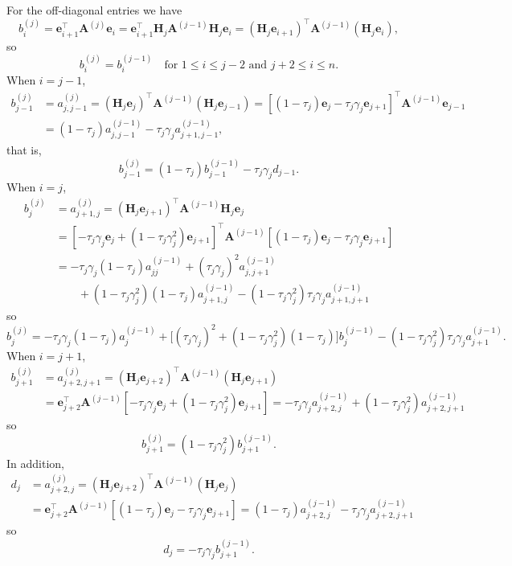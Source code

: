 \documentclass[12pt,a4paper]{article}
\newcommand{\bs}[1]{\boldsymbol{#1}}
\begin{document}
For the off-diagonal entries we have
\[
b^{(j)}_i=\bs{e}_{i+1}^\top\bs{A}^{(j)}\bs{e}_i
	=\bs{e}_{i+1}^\top\bs{H}_j\bs{A}^{(j-1)}\bs{H}_j\bs{e}_i
	=(\bs{H}_j\bs{e}_{i+1})^\top\bs{A}^{(j-1)}(\bs{H}_j\bs{e}_i),
\]
so
\[
b^{(j)}_i=b^{(j-1)}_i\quad\text{for $1\le i\le j-2$ and $j+2\le i\le n$.}
\]
When $i=j-1$,
\begin{align*}
b^{(j)}_{j-1}&=a^{(j)}_{j,j-1}
	=(\bs{H}_j\bs{e}_j)^\top\bs{A}^{(j-1)}(\bs{H}_j\bs{e}_{j-1})
	=[(1-\tau_j)\bs{e}_j-\tau_j\gamma_j\bs{e}_{j+1}]^\top
		\bs{A}^{(j-1)}\bs{e}_{j-1}\\
	&=(1-\tau_j)a^{(j-1)}_{j,j-1}-\tau_j\gamma_ja^{(j-1)}_{j+1,j-1},
\end{align*}
that is,
\[
b^{(j)}_{j-1}=(1-\tau_j)b^{(j-1)}_{j-1}-\tau_j\gamma_jd_{j-1}.
\]
When $i=j$,
\begin{align*}
b^{(j)}_j&=a^{(j)}_{j+1,j}
	=(\bs{H}_j\bs{e}_{j+1})^\top\bs{A}^{(j-1)}\bs{H}_j\bs{e}_j\\
	&=[-\tau_j\gamma_j\bs{e}_j+(1-\tau_j\gamma_j^2)\bs{e}_{j+1}]^\top
	\bs{A}^{(j-1)}[(1-\tau_j)\bs{e}_j-\tau_j\gamma_j\bs{e}_{j+1}]\\
	&=-\tau_j\gamma_j(1-\tau_j)a^{(j-1)}_{jj}
	+(\tau_j\gamma_j)^2a^{(j-1)}_{j,j+1}\\
	&\qquad{}+(1-\tau_j\gamma_j^2)(1-\tau_j)a^{(j-1)}_{j+1,j}
	-(1-\tau_j\gamma_j^2)\tau_j\gamma_ja^{(j-1)}_{j+1,j+1}
\end{align*}
so
\[
 b^{(j)}_j=-\tau_j\gamma_j(1-\tau_j)a^{(j-1)}_j
	+\bigl[(\tau_j\gamma_j)^2+(1-\tau_j\gamma_j^2)(1-\tau_j)\bigr]b^{(j-1)}_j
	-(1-\tau_j\gamma_j^2)\tau_j\gamma_ja^{(j-1)}_{j+1}.
\]
When $i=j+1$,
\begin{align*}
b^{(j)}_{j+1}&=a^{(j)}_{j+2,j+1}
	=(\bs{H}_j\bs{e}_{j+2})^\top\bs{A}^{(j-1)}(\bs{H}_j\bs{e}_{j+1})\\
	&=\bs{e}_{j+2}^\top\bs{A}^{(j-1)}
		[-\tau_j\gamma_j\bs{e}_j+(1-\tau_j\gamma_j^2)\bs{e}_{j+1}]
	=-\tau_j\gamma_ja^{(j-1)}_{j+2,j}+(1-\tau_j\gamma_j^2)a^{(j-1)}_{j+2,j+1}
\end{align*}
so
\[
b^{(j)}_{j+1}=(1-\tau_j\gamma_j^2)b^{(j-1)}_{j+1}.
\]
In addition,
\begin{align*}
d_j&=a^{(j)}_{j+2,j}
	=(\bs{H}_j\bs{e}_{j+2})^\top\bs{A}^{(j-1)}(\bs{H}_j\bs{e}_j)\\
	&=\bs{e}_{j+2}^\top\bs{A}^{(j-1)}
	[(1-\tau_j)\bs{e}_j-\tau_j\gamma_j\bs{e}_{j+1}]
	=(1-\tau_j)a^{(j-1)}_{j+2,j}-\tau_j\gamma_ja^{(j-1)}_{j+2,j+1}
\end{align*}
so
\[
d_j=-\tau_j\gamma_jb^{(j-1)}_{j+1}.
\]
\end{document}
